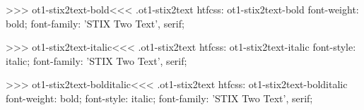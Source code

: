 >>>
\<ot1-stix2text-bold\><<<
.ot1-stix2text
htfcss:  ot1-stix2text-bold  font-weight: bold; font-family: 'STIX Two Text', serif;

>>>
\<ot1-stix2text-italic\><<<
.ot1-stix2text
htfcss:  ot1-stix2text-italic  font-style: italic; font-family: 'STIX Two Text', serif;

>>>
\<ot1-stix2text-bolditalic\><<<
.ot1-stix2text
htfcss:  ot1-stix2text-bolditalic  font-weight: bold; font-style: italic; font-family: 'STIX Two Text', serif;

